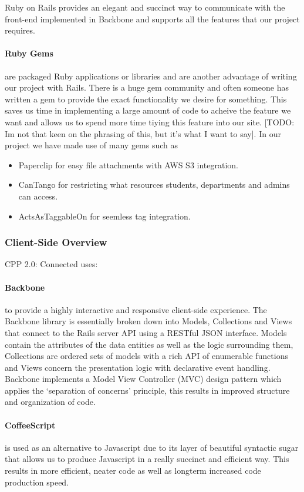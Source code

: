 		Ruby on Rails provides an elegant and succinct way to communicate with the front-end implemented in Backbone and supports all the features that our project requires. 

		\paragraph{Ruby Gems\cite{gems}} are packaged Ruby applications or libraries and are another advantage of writing our project with Rails. There is a huge gem community and often someone has written a gem to provide the exact functionality we desire for something. This saves us time in implementing a large amount of code to acheive the feature we want and allows us to spend more time tiying this feature into our site. [TODO: Im not that keen on the phrasing of this, but it's what I want to say]. In our project we have made use of many gems such as
		\begin{itemize}
		 \item Paperclip\cite{paperclip} for easy file attachments with AWS S3\cite{s3} integration.
		 \item CanTango\cite{cantango} for restricting what resources students, departments and admins can access.
		 \item ActsAsTaggableOn\cite{tags} for seemless tag integration.
		\end{itemize}
	\subsubsection{Client-Side Overview}
		CPP 2.0: Connected uses:
		\paragraph{Backbone\cite{backbone}} to provide a highly interactive and responsive client-side experience. The Backbone library is essentially broken down into Models, Collections and Views that connect to the Rails server API using a RESTful JSON interface. Models contain the attributes of the data entities as well as the logic surrounding them, Collections are ordered sets of models with a rich API of enumerable functions and Views concern the presentation logic with declarative event handling. Backbone implements a Model View Controller (MVC) design pattern which applies the `separation of  concerns' principle, this results in improved structure and organization of code.
		\paragraph{CoffeeScript\cite{coffeescript}} is used as an alternative to Javascript due to its layer of beautiful syntactic sugar that allows us to produce Javascript in a really succinct and efficient way. This results in more efficient, neater code as well as longterm increased code production speed.
